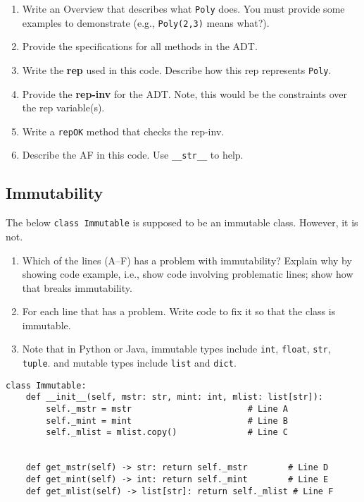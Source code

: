 \documentclass[oneside,11pt,dvipsnames]{book}
\newcommand{\sol}[1]{\iftoggle{usesol}{\textbf{Sol:} #1}{}}
\newcommand{\code}[1]{\texttt{#1}}
\begin{document}
\begin{enumerate}
\item Write an Overview that describes what \code{Poly} does. You must provide some examples to demonstrate (e.g., \code{Poly(2,3)} means what?).
\item Provide the specifications for all methods in the ADT. 
\item Write the \textbf{rep} used in this code.  Describe how this rep represents \code{Poly}.
\item Provide the \textbf{rep-inv} for the ADT. Note, this would be the constraints over the rep variable(s).
\item Write a \code{repOK} method that checks the rep-inv.
\item Describe the AF in this code. Use \code{\_\_str\_\_} to help.
\end{enumerate}


\subsection{Immutability}

The below \code{class Immutable} is supposed to be an immutable class. However, it is not. 
\begin{enumerate}
\item Which of the lines (A--F) has a problem with immutability? Explain why by showing code example, i.e., show code involving problematic lines; show how that breaks immutability.
\sol{only line F is problematic. It returns a reference to the internal list, which can be modified. Note that line C has no issue because it creates a copy of the list. If there was no copy, then this would cause a problem as mlist could be modified outside the class and affects \code{_mlist}.}
\item For each line that has a problem.  Write code to fix it so that the class is immutable.
\item Note that in Python or Java, immutable types include \code{int}, \code{float}, \code{str}, \code{tuple}. and mutable types include \code{list} and \code{dict}.
\end{enumerate}

    
\begin{lstlisting}
class Immutable:
    def __init__(self, mstr: str, mint: int, mlist: list[str]):
        self._mstr = mstr                       # Line A
        self._mint = mint                       # Line B
        self._mlist = mlist.copy()              # Line C

    
    def get_mstr(self) -> str: return self._mstr        # Line D
    def get_mint(self) -> int: return self._mint        # Line E
    def get_mlist(self) -> list[str]: return self._mlist # Line F
\end{lstlisting}
\end{document}
